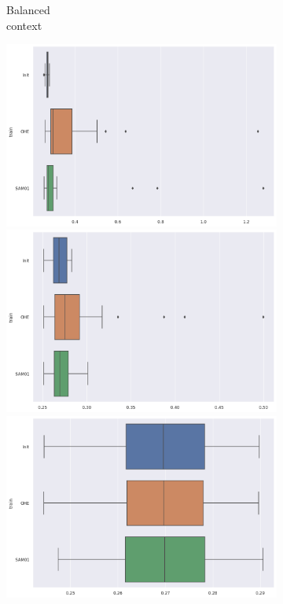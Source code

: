 \documentclass{article}
\theoremstyle{definition}
\begin{document}
\begin{figure}[ht]
\begin{subfigure}[b]{0.15\textwidth}
         \caption{Balanced \\ context}
         \label{Prediction_Bal_X}
     \end{subfigure}
     \begin{subfigure}[b]{0.15\textwidth}
         \centering
         \includegraphics[width=\textwidth]{imgs/Illu/1000Epochs/Majo/Boxplots_predTest_Xhat.png}
         \quad
         \includegraphics[width=\textwidth]{imgs/Illu/2000Epochs/Majo/Boxplots_predTest_Xhat.png}
         \quad
         \includegraphics[width=\textwidth]{imgs/Illu/3000Epochs/Majo/Boxplots_predTest_Xhat.png}

\end{subfigure}
\end{figure}
\end{document}
